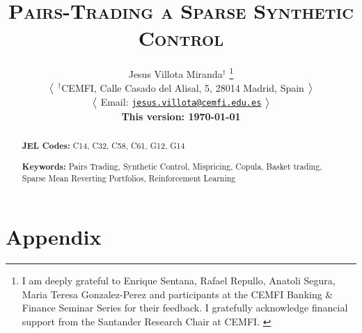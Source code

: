 \documentclass[12pt,a4paper]{article}
\title{
\textsc{
\Large 
Pairs-Trading a Sparse Synthetic Control
}
}
\author[1]{
{  
{
\large 
Jesus Villota Miranda}$^{\dagger}$
\footnote{
\scriptsize{
I am deeply grateful to Enrique Sentana, Rafael Repullo, Anatoli Segura, Maria Teresa Gonzalez-Perez and participants at the CEMFI Banking \& Finance Seminar Series for their feedback.
I gratefully acknowledge financial support from the Santander Research Chair at CEMFI.
}
}
}

\bx 
{\small
$\big{<}$
\noindent $^{\dagger}$CEMFI, Calle Casado del Alisal, 5, 28014 Madrid, Spain 
$\big{>}$

$\big{<}$
Email: \href{mailto:jesus.villota@cemfi.edu.es}{\texttt{jesus.villota@cemfi.edu.es}}
$\big{>}$

\small \textbf{This version: \mydate\today}
}
}
\date{}
\begin{document}
\maketitle
\thispagestyle{empty}
\begin{abstract}
 

\bx 
\noindent\textbf{JEL Codes:} C14, C32, C58, C61, G12, G14

\mx 
\noindent\textbf{Keywords:} 
Pairs Trading, 
Synthetic Control, 
Mispricing, 
Copula, 
Basket trading, 
Sparse Mean Reverting Portfolios, 
Reinforcement Learning
\end{abstract}

\newpage
\setcounter{page}{1}





%

%

%

%

%


\newpage
\processdelayedfloats 
\renewcommand{\thefigure}{A\arabic{figure}} 
\renewcommand{\thetable}{A\arabic{table}}

\appendix
\newpage
\section{Appendix}

\end{document}
